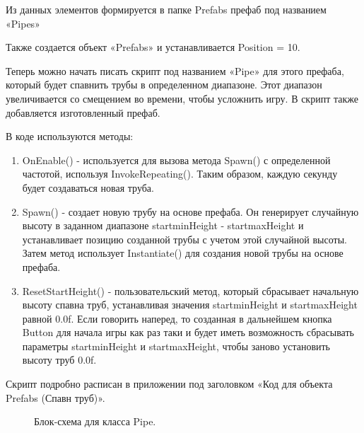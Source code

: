 \documentclass[14pt, oneside]{altsu-report}
\begin{document}
Из данных элементов формируется в папке Prefabs префаб под названием «Pipes»

Также создается объект «Prefabs» и устанавливается Position = 10.

Теперь можно начать писать скрипт под названием «Pipe» для этого префаба, который будет спавнить трубы в определенном диапазоне. Этот диапазон увеличивается со смещением во времени, чтобы усложнить игру. В скрипт также добавляется изготовленный префаб. 

В коде используются методы:

\begin{enumerate}
\item OnEnable() - используется для вызова метода Spawn() с определенной частотой, используя InvokeRepeating(). Таким образом, каждую секунду будет создаваться новая труба.
\item Spawn() - создает новую трубу на основе префаба. Он генерирует случайную высоту в заданном диапазоне startminHeight - startmaxHeight и устанавливает позицию созданной трубы с учетом этой случайной высоты. Затем метод использует Instantiate() для создания новой трубы на основе префаба.
\item ResetStartHeight() - пользовательский метод, который сбрасывает начальную высоту спавна труб, устанавливая значения startminHeight и startmaxHeight равной 0.0f. Если говорить наперед, то созданная в дальнейшем кнопка Button для начала игры как раз таки и будет иметь возможность сбрасывать параметры startminHeight и startmaxHeight, чтобы заново установить высоту труб 0.0f.
\end{enumerate} 

Скрипт подробно расписан в приложении под заголовком «Код для объекта Prefabs (Спавн труб)».

\begin{figure}[H]
\caption{Блок-схема для класса Pipe.}
\end{figure}
\end{document}

